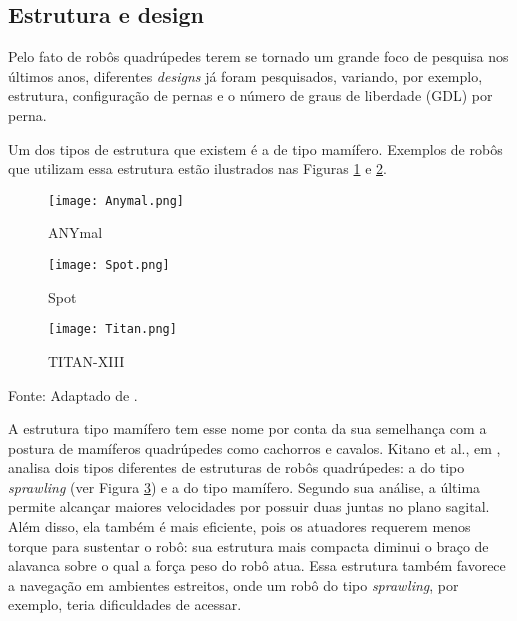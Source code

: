 \documentclass[../main.tex]{subfiles}
\begin{document}
\subsection{Estrutura e design}
Pelo fato de robôs quadrúpedes terem se tornado um grande foco de pesquisa nos últimos anos, diferentes \textit{designs} já foram pesquisados, variando, por exemplo, estrutura, configuração de pernas e o número de graus de liberdade (GDL) por perna.

Um dos tipos de estrutura que existem é a de tipo mamífero. Exemplos de robôs que utilizam essa estrutura estão ilustrados nas Figuras \ref{fig:robots_structures_a} e \ref{fig:robots_structures_b}.

\begin{figure*}[h]
  \centering
  \caption{Exemplos de robôs com estruturas do tipo mamífero e \textit{sprawling}.}
  \begin{subfigure}[t]{0.32\textwidth}
    \texttt{[image: Anymal.png]}
    \caption{ANYmal}
    \label{fig:robots_structures_a}
  \end{subfigure}
  \begin{subfigure}[t]{0.32\textwidth}
    \texttt{[image: Spot.png]}
    \caption{Spot}
    \label{fig:robots_structures_b}
  \end{subfigure}
  \begin{subfigure}[t]{0.32\textwidth}
    \texttt{[image: Titan.png]}
    \caption{TITAN-XIII}
    \label{fig:robots_structures_c}
  \end{subfigure}
  Fonte: Adaptado de \cite{AnymalImg1} \cite{SpotImg1} \cite{Kitano2016}.
  \label{fig:robots_structures}
\end{figure*}

A estrutura tipo mamífero tem esse nome por conta da sua semelhança com a postura de mamíferos quadrúpedes como cachorros e cavalos. Kitano et al., em \cite{Kitano2016}, analisa dois tipos diferentes de estruturas de robôs quadrúpedes: a do tipo \textit{sprawling} (ver Figura \ref{fig:robots_structures_c}) e a do tipo mamífero. Segundo sua análise, a última permite alcançar maiores velocidades por possuir duas juntas no plano sagital. Além disso, ela também é mais eficiente, pois os atuadores requerem menos torque para sustentar o robô: sua estrutura mais compacta diminui o braço de alavanca sobre o qual a força peso do robô atua. Essa estrutura também favorece a navegação em ambientes estreitos, onde um robô do tipo \textit{sprawling}, por exemplo, teria dificuldades de acessar.
\end{document}
